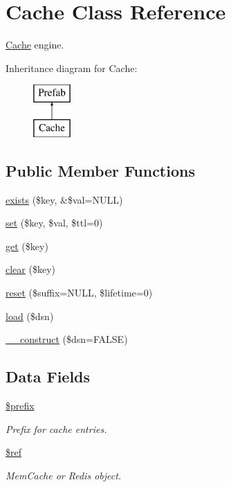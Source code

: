 \hypertarget{class_cache}{}\section{Cache Class Reference}
\label{class_cache}


\hyperlink{class_cache}{Cache} engine.  


Inheritance diagram for Cache\+:\begin{figure}[H]
\begin{center}
\leavevmode
\includegraphics[height=2.000000cm]{class_cache}
\end{center}
\end{figure}
\subsection*{Public Member Functions}
\begin{DoxyCompactItemize}
\item 
\hyperlink{class_cache_a28497caad131119319e31168c38713b6}{exists} (\$key, \&\$val=N\+U\+LL)
\item 
\hyperlink{class_cache_a845297666b2c78affb9fa78605ebf93e}{set} (\$key, \$val, \$ttl=0)
\item 
\hyperlink{class_cache_a24a9bf83a1002d46ece83a93d14bd921}{get} (\$key)
\item 
\hyperlink{class_cache_a10a949ef75de6c82c98ac555f371ba83}{clear} (\$key)
\item 
\hyperlink{class_cache_ada19e349da5d9093164fe0c05b1d5bf3}{reset} (\$suffix=N\+U\+LL, \$lifetime=0)
\item 
\hyperlink{class_cache_a0c573a775b081079b350498980565fa2}{load} (\$dsn)
\item 
\hyperlink{class_cache_a53b443dea5ef4422f7335a380e654c98}{\+\_\+\+\_\+construct} (\$dsn=F\+A\+L\+SE)
\end{DoxyCompactItemize}
\subsection*{Data Fields}
\begin{DoxyCompactItemize}
\item 
\hypertarget{class_cache_a09e8cf95b9d29955a0bfabca9b420edc}{}\label{class_cache_a09e8cf95b9d29955a0bfabca9b420edc} 
\hyperlink{class_cache_a09e8cf95b9d29955a0bfabca9b420edc}{\$prefix}
\begin{DoxyCompactList}\small\item\em Prefix for cache entries. \end{DoxyCompactList}\item 
\hypertarget{class_cache_af63b439d0c69c1a6e9c2d1b9a4f4af9e}{}\label{class_cache_af63b439d0c69c1a6e9c2d1b9a4f4af9e} 
\hyperlink{class_cache_af63b439d0c69c1a6e9c2d1b9a4f4af9e}{\$ref}
\begin{DoxyCompactList}\small\item\em Mem\+Cache or Redis object. \end{DoxyCompactList}\end{DoxyCompactItemize}
